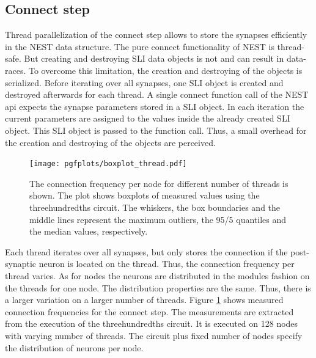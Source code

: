 \subsection{Connect step}
\label{sec:speedup:connect}
Thread parallelization of the connect step allows to store the synapses efficiently in the NEST data structure.
The pure connect functionality of NEST is thread-safe. But creating and destroying SLI data objects is not and can result
in data-races. To overcome this limitation, the creation and destroying of the objects is serialized.
Before iterating over all synapses, one SLI object is created and destroyed afterwards for each thread.
A single connect function call of the NEST api expects the synapse parameters stored in a SLI object.
In each iteration the current parameters are assigned to the values inside the already created SLI object.
This SLI object is passed to the function call.
Thus, a small overhead for the creation and destroying of the objects are perceived.
\begin{figure}[ht!]
\centering
\texttt{[image: pgfplots/boxplot\_thread.pdf]}
\caption{The connection frequency per node for different number of threads is shown.
The plot shows boxplots of measured values using the threehundredths circuit.
The whiskers, the box boundaries and the middle lines represent the maximum outliers,
the 95/5 quantiles and the median values, respectively.
}
\label{boxplotnewcon}
\end{figure}
Each thread iterates over all synapses, but only stores the connection if the post-synaptic neuron is located on
the thread. Thus, the connection frequency per thread varies.
As for nodes the neurons are distributed in the modules fashion on the threads for one node.
The distribution properties are the same. Thus, there is a larger variation on a larger number of threads.
Figure \ref{boxplotnewcon} shows measured connection frequencies for the connect step. The measurements are
extracted from the execution of the threehundredths circuit. It is executed on 128 nodes with varying number of
threads. The circuit plus fixed number of nodes specify the distribution of neurons per node.

